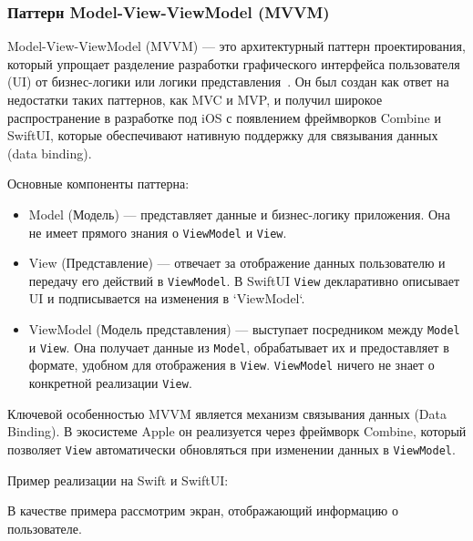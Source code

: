 \documentclass[14pt, russian]{scrartcl}
\begin{document}
\subsubsection{Паттерн Model-View-ViewModel (MVVM)}

Model-View-ViewModel (MVVM) — это архитектурный паттерн проектирования, который упрощает разделение разработки графического интерфейса пользователя (UI) от бизнес-логики или логики представления~\cite{fuksa2025mvvm}. Он был создан как ответ на недостатки таких паттернов, как MVC и MVP, и получил широкое распространение в разработке под iOS с появлением фреймворков Combine и SwiftUI, которые обеспечивают нативную поддержку для связывания данных (data binding).

Основные компоненты паттерна:
\begin{itemize}
    \item Model (Модель) — представляет данные и бизнес-логику приложения. Она не имеет прямого знания о \texttt{ViewModel} и \texttt{View}.
    \item View (Представление) — отвечает за отображение данных пользователю и передачу его действий в \texttt{ViewModel}. В SwiftUI \texttt{View} декларативно описывает UI и подписывается на изменения в `ViewModel`.
    \item ViewModel (Модель представления) — выступает посредником между \texttt{Model} и \texttt{View}. Она получает данные из \texttt{Model}, обрабатывает их и предоставляет в формате, удобном для отображения в \texttt{View}. \texttt{ViewModel} ничего не знает о конкретной реализации \texttt{View}.
\end{itemize}

Ключевой особенностью MVVM является механизм связывания данных (Data Binding). В экосистеме Apple он реализуется через фреймворк Combine, который позволяет \texttt{View} автоматически обновляться при изменении данных в \texttt{ViewModel}.

Пример реализации на Swift и SwiftUI:

В качестве примера рассмотрим экран, отображающий информацию о пользователе.
\end{document}
